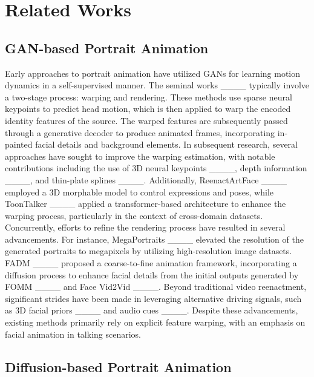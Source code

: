 \section{Related Works}
\subsection{GAN-based Portrait Animation}

Early approaches to portrait animation have utilized GANs for learning motion dynamics in a self-supervised manner. The seminal works ____ typically involve a two-stage process: warping and rendering. These methods use sparse neural keypoints to predict head motion, which is then applied to warp the encoded identity features of the source. The warped features are subsequently passed through a generative decoder to produce animated frames, incorporating in-painted facial details and background elements. In subsequent research, several approaches have sought to improve the warping estimation, with notable contributions including the use of 3D neural keypoints ____, depth information ____, and thin-plate splines ____. Additionally, ReenactArtFace ____ employed a 3D morphable model to control expressions and poses, while ToonTalker ____ applied a transformer-based architecture to enhance the warping process, particularly in the context of cross-domain datasets. Concurrently, efforts to refine the rendering process have resulted in several advancements. For instance, MegaPortraits ____ elevated the resolution of the generated portraits to megapixels by utilizing high-resolution image datasets. FADM ____ proposed a coarse-to-fine animation framework, incorporating a diffusion process to enhance facial details from the initial outputs generated by FOMM ____ and Face Vid2Vid ____. Beyond traditional video reenactment, significant strides have been made in leveraging alternative driving signals, such as 3D facial priors ____ and audio cues ____. Despite these advancements, existing methods primarily rely on explicit feature warping, with an emphasis on facial animation in talking scenarios. 




\subsection{Diffusion-based Portrait Animation}

